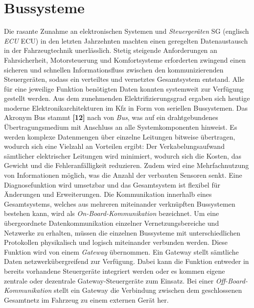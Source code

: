 \section{Bussysteme} \label{sec:Bussysteme}
Die rasante Zunahme an elektronischen Systemen und \emph{Steuergeräten} \acs{SG} (englisch \emph{\acl{ECU}} \acs{ECU}) in den letzten Jahrzehnten machten einen geregelten Datenaustausch in der Fahrzeugtechnik unerlässlich. Stetig steigende Anforderungen an Fahrsicherheit, Motorsteuerung und Komfortsysteme erforderten zwingend einen sicheren und schnellen Informationsfluss zwischen den kommunizierenden Steuergeräten, sodass ein verteiltes und vernetztes Gesamtsystem entstand. Alle für eine jeweilige Funktion benötigten Daten konnten systemweit zur Verfügung gestellt werden. Aus dem zunehmenden Elektrifizierungsgrad ergaben sich heutige moderne Elektronikarchitekturen im Kfz in Form von seriellen Bussystemen. Das Akronym \acs{Bus} stammt \textbf{[12]} nach von \emph{\acl{Bus}}, was auf ein drahtgebundenes Übertragungsmedium mit Anschluss an alle Systemkomponenten hinweist. Es werden komplexe Datenmengen über einzelne Leitungen bitweise übertragen, wodurch sich eine Vielzahl an Vorteilen ergibt: Der Verkabelungsaufwand sämtlicher elektrischer Leitungen wird minimiert, wodurch sich die Kosten, das Gewicht und die Fehleranfälligkeit reduzieren. Zudem wird eine Mehrfachnutzung von Informationen möglich, was die Anzahl der verbauten Sensoren senkt. Eine Diagnosefunktion wird umsetzbar und das Gesamtsystem ist flexibel für Änderungen und Erweiterungen. Die Kommunikation innerhalb eines Gesamtsystems, welches aus mehreren miteinander verknüpften Bussystemen bestehen kann, wird als \emph{On-Board-Kommunikation} bezeichnet. Um eine übergeordnete Datenkommunikation einzelner Vernetzungsbereiche und Netzwerke zu erhalten, müssen die einzelnen Bussysteme mit unterschiedlichen Protokollen physikalisch und logisch miteinander verbunden werden. Diese Funktion wird von einem \emph{Gateway} übernommen. Ein Gateway stellt sämtliche Daten netzwerkübergreifend zur Verfügung. Dabei kann die Funktion entweder in bereits vorhandene Steuergeräte integriert werden oder es kommen eigene zentrale oder dezentrale Gateway-Steuergeräte zum Einsatz. Bei einer \emph{Off-Board-Kommunikation} stellt ein Gateway die Verbindung zwischen dem geschlossenen Gesamtnetz im Fahrzeug zu einem externen Gerät her. \\

